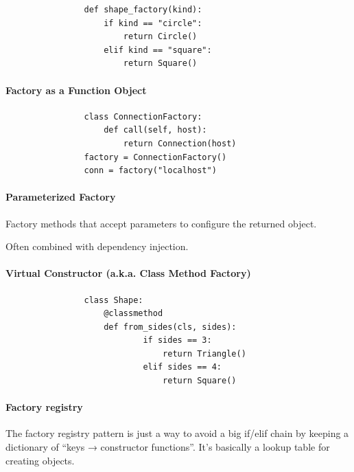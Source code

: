             \begin{verbatim}
                def shape_factory(kind):
                    if kind == "circle":
                        return Circle()
                    elif kind == "square":
                        return Square()
            \end{verbatim}
        
        \paragraph{Factory as a Function Object}
            
            \begin{verbatim}
                class ConnectionFactory:
                    def call(self, host):
                        return Connection(host)
                factory = ConnectionFactory()
                conn = factory("localhost")
            \end{verbatim}
        
        \paragraph{Parameterized Factory}
            
            Factory methods that accept parameters to configure the returned object.
            
            Often combined with dependency injection.
        
        \paragraph{Virtual Constructor (a.k.a. Class Method Factory)}
            
            \begin{verbatim}
                class Shape:
                    @classmethod
                    def from_sides(cls, sides):
                            if sides == 3:
                                return Triangle()
                            elif sides == 4:
                                return Square()
                            \end{verbatim}
        
        \paragraph{Factory registry}
            
            The factory registry pattern is just a way to avoid a big if/elif chain by keeping a dictionary of “keys → constructor functions”. It’s basically a lookup table for creating objects.
            
